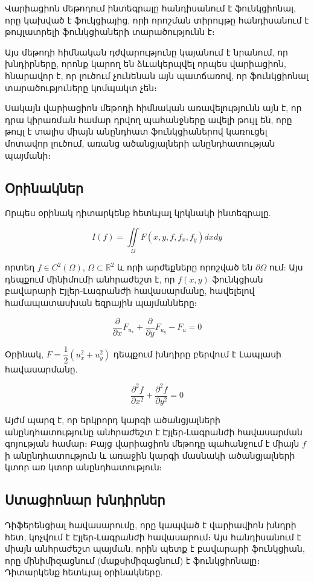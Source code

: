 \documentclass[fleqn, bachelor,subf,12pt,notitlepage]{disser}
\begin{document}
Վարիացիոն մեթոդում ինտեգրալը հանդիսանում է ֆունկցիոնալ, որը կախված է ֆուկցիայից, որի որոշման տիրույթը հանդիսանում է թույլատրելի ֆունկցիաների \newline տարածությունն է։ 

Այս  մեթոդի հիմնական դժվարությունը կայանում է նրանում, որ խնդիրները, որոնք կարող են ձևակերպվել որպես վարիացիոն, հնարավոր է, որ լուծում չունենան այն պատճառով, որ ֆունկցիոնալ տարածություները  կոմպակտ չեն։

Սակայն վարիացիոն մեթոդի հիմնական առավելությունն այն է, որ դրա կիրառման համար դրվող պահանջները ավելի թույլ են, որը թույլ է տալիս միայն անընդհատ \newpage ֆունկցիաներով կառուցել մոտավոր լուծում, առանց ածանցյալների անընդհատության պայմանի։

\newpage
\subsection*{Օրինակներ}

Որպես օրինակ դիտարկենք հետևյալ կրկնակի ինտեգրալը.

$$I\left(f\right)=\iint \limits_{\Omega} F\left(x, y, f, f_{x}, f_{y}\right)dxdy$$

\noindent որտեղ $f \in C^{2}(\Omega)$,  $\Omega\subset \mathbb{R}^{2}$ և որի արժեքները որոշված են $\partial \Omega$ ում:
\noindent Այս դեպքում մինիմումի անհրաժեշտ է, որ $f(x,y)$ ֆունկցիան բավարարի Էյլեր֊Լագրանժի հավասարմանը, հավելելով համապատասխան եզրային պայմանները։

$$\dfrac{\partial}{\partial x}F_{u_{x}} + \dfrac{\partial}{\partial y}F_{u_{y}} - F_{u} = 0$$

\noindent Օրինակ, $F = \dfrac{1}{2}\left(u_{x}^2+u_{y}^2\right)$ դեպքում խնդիրը բերվում է Լապլասի հավասարմանը.

$$\dfrac{\partial^{2}f}{\partial x^{2}} + \dfrac{\partial^{2}f}{\partial y^{2}} = 0$$


Այժմ պարզ է, որ երկրորդ կարգի ածանցյալների անընդհատությունը անհրաժեշտ է Էյլեր֊Լագրանժի հավասարման գոյության համար։ Բայց վարիացիոն մեթոդը պահանջում է միայն $f$ ի անընդհատություն և առաջին կարգի մասնակի ածանցյալների կտոր առ կտոր անընդհատություն։

\subsection*{Ստացիոնար խնդիրներ} %

Դիֆերենցիալ հավասարումը, որը կապված է վարիավիոն խնդրի հետ, կոչվում է Էյլեր֊Լագրանժի հավասարում։ Այս հանդիսանում է միայն անհրաժեշտ պայման, որին պետք է բավարարի ֆունկցիան, որը մինիմիզացնում (մաքսիմիզացնում) է ֆունկցիոնալը։ 
Դիտարկենք հետևյալ օրինակները.
\end{document}
